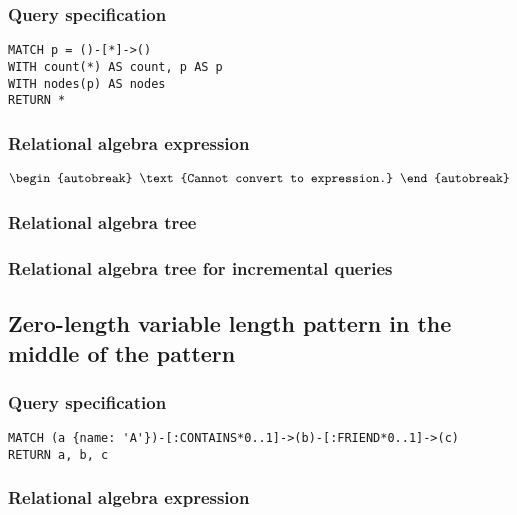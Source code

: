 \subsubsection*{Query specification}

\begin{lstlisting}
MATCH p = ()-[*]->()
WITH count(*) AS count, p AS p
WITH nodes(p) AS nodes
RETURN *
\end{lstlisting}

\subsubsection*{Relational algebra expression}

\begin{align*}
\begin{autobreak}
\text{Cannot convert to expression.}
\end{autobreak}
\end{align*}

\subsubsection*{Relational algebra tree}


\subsubsection*{Relational algebra tree for incremental queries}


\subsection{Zero-length variable length pattern in the middle of the pattern}

\subsubsection*{Query specification}

\begin{lstlisting}
MATCH (a {name: 'A'})-[:CONTAINS*0..1]->(b)-[:FRIEND*0..1]->(c)
RETURN a, b, c
\end{lstlisting}

\subsubsection*{Relational algebra expression}

